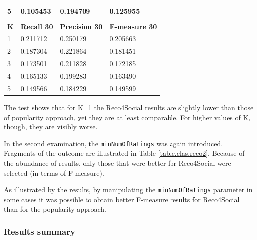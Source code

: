 \documentclass[12pt]{report}
\begin{document}
\begin{table}[htpb]
\begin{tabular}{llll}
\multicolumn{1}{|l|}{5}       & \multicolumn{1}{l|}{0.105453}        & \multicolumn{1}{l|}{0.194709}           & \multicolumn{1}{l|}{0.125955}           \\ \hline
                              &                                      &                                         &                                         \\ \hline
\multicolumn{1}{|l|}{{\bf K}} & \multicolumn{1}{l|}{{\bf Recall 30}} & \multicolumn{1}{l|}{{\bf Precision 30}} & \multicolumn{1}{l|}{{\bf F-measure 30}} \\ \hline
\multicolumn{1}{|l|}{1}       & \multicolumn{1}{l|}{0.211712}        & \multicolumn{1}{l|}{0.250179}           & \multicolumn{1}{l|}{0.205663}           \\ \hline
\multicolumn{1}{|l|}{2}       & \multicolumn{1}{l|}{0.187304}        & \multicolumn{1}{l|}{0.221864}           & \multicolumn{1}{l|}{0.181451}           \\ \hline
\multicolumn{1}{|l|}{3}       & \multicolumn{1}{l|}{0.173501}        & \multicolumn{1}{l|}{0.211828}           & \multicolumn{1}{l|}{0.172185}           \\ \hline
\multicolumn{1}{|l|}{4}       & \multicolumn{1}{l|}{0.165133}        & \multicolumn{1}{l|}{0.199283}           & \multicolumn{1}{l|}{0.163490}           \\ \hline
\multicolumn{1}{|l|}{5}       & \multicolumn{1}{l|}{0.149566}        & \multicolumn{1}{l|}{0.184229}           & \multicolumn{1}{l|}{0.149599}           \\ \hline
\end{tabular}
\end{table}

The test shows that for K=1 the Reco4Social results are slightly lower than those of popularity approach, yet they are at least comparable. For higher values of K, though, they are visibly worse.

In the second examination, the \texttt{min\-Num\-Of\-Ratings} was again introduced. Fragments of the outcome are illustrated in Table \ref{table.clas.reco2}. Because of the abundance of results, only those that were better for Reco4Social were selected (in terms of F-measure).

As illustrated by the results, by manipulating the \texttt{min\-Num\-Of\-Ratings} parameter in some cases it was possible to obtain better F-measure results for Reco4Social than for the popularity approach.

\subsubsection{Results summary}
\end{document}
